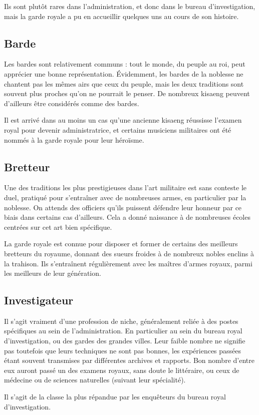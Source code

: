 \documentclass[10pt,a4paper]{book}
\begin{document}
Ils sont plutôt rares dans l'administration, et donc dans le bureau d'investigation, mais la garde royale a pu en accueillir quelques uns au cours de son histoire.
\subsection{Barde}
Les bardes sont relativement communs : tout le monde, du peuple au roi, peut apprécier une bonne représentation. Évidemment, les bardes de la noblesse ne chantent pas les mêmes airs que ceux du peuple, mais les deux traditions sont souvent plus proches qu'on ne pourrait le penser. De nombreux kisaeng peuvent d'ailleurs être considérés comme des bardes.

Il est arrivé dans au moins un cas qu'une ancienne kisaeng réussisse l'examen royal pour devenir administratrice, et certains musiciens militaires ont été nommés à la garde royale pour leur héroïsme.
\subsection{Bretteur}
Une des traditions les plus prestigieuses dans l'art militaire est sans conteste le duel, pratiqué pour s'entraîner avec de nombreuses armes, en particulier par la noblesse. On attends des officiers qu'ils puissent défendre leur honneur par ce biais dans certains cas d'ailleurs. Cela a donné naissance à de nombreuses écoles centrées sur cet art bien spécifique.

La garde royale est connue pour disposer et former de certains des meilleurs bretteurs du royaume, donnant des sueurs froides à de nombreux nobles enclins à la trahison. Ils s'entraînent régulièrement avec les maîtres d'armes royaux, parmi les meilleurs de leur génération.
\subsection{Investigateur}
Il s'agit vraiment d'une profession de niche, généralement reliée à des postes spécifiques au sein de l'administration. En particulier au sein du bureau royal d'investigation, ou des gardes des grandes villes. Leur faible nombre ne signifie pas toutefois que leurs techniques ne sont pas bonnes, les expériences passées étant souvent transmises par différentes archives et rapports. Bon nombre d'entre eux auront passé un des examens royaux, sans doute le littéraire, ou ceux de médecine ou de sciences naturelles (suivant leur spécialité).

Il s'agit de la classe la plus répandue par les enquêteurs du bureau royal d'investigation.
\end{document}
